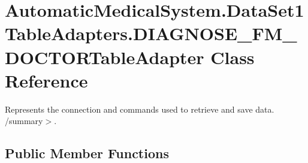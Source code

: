 \section{AutomaticMedicalSystem.DataSet1TableAdapters.DIAGNOSE\_\-FM\_\-DOCTORTableAdapter Class Reference}
\label{class_automatic_medical_system_1_1_data_set1_table_adapters_1_1_d_i_a_g_n_o_s_e___f_m___d_o_c_t_o_r_table_adapter}
Represents the connection and commands used to retrieve and save data. /summary$>$.  


\subsection*{Public Member Functions}
